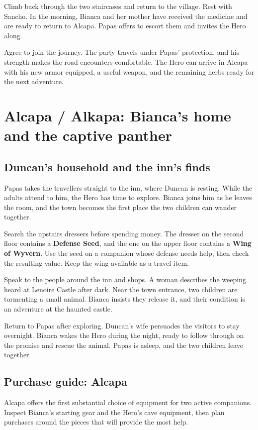 Climb back through the two staircases and return to the village. Rest
with Sancho. In the morning, Bianca and her mother have received the
medicine and are ready to return to Alcapa. Papas offers to escort them
and invites the Hero along.

Agree to join the journey. The party travels under Papas' protection,
and his strength makes the road encounters comfortable. The Hero can
arrive in Alcapa with his new armor equipped, a useful weapon, and the
remaining herbs ready for the next adventure.

\section{Alcapa / Alkapa: Bianca's home and the captive panther}

\subsection*{Duncan's household and the inn's finds}

Papas takes the travellers straight to the inn, where Duncan is resting.
While the adults attend to him, the Hero has time to explore. Bianca joins
him as he leaves the room, and the town becomes the first place the two
children can wander together.

Search the upstairs dressers before spending money. The dresser on the
second floor contains a \textbf{Defense Seed}, and the one on the upper
floor contains a \textbf{Wing of Wyvern}. Use the seed on a companion
whose defense needs help, then check the resulting value. Keep the wing
available as a travel item.

Speak to the people around the inn and shops. A woman describes the
weeping heard at Lenoire Castle after dark. Near the town entrance, two
children are tormenting a small animal. Bianca insists they release it,
and their condition is an adventure at the haunted castle.

Return to Papas after exploring. Duncan's wife persuades the visitors to
stay overnight. Bianca wakes the Hero during the night, ready to follow
through on the promise and rescue the animal. Papas is asleep, and the
two children leave together.

\subsection*{Purchase guide: Alcapa}

Alcapa offers the first substantial choice of equipment for two active
companions. Inspect Bianca's starting gear and the Hero's cave equipment,
then plan purchases around the pieces that will provide the most help.

